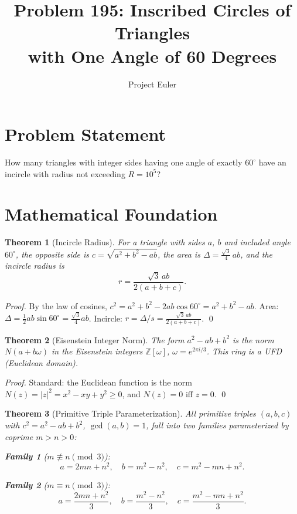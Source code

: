 \documentclass[12pt]{article}
\title{Problem 195: Inscribed Circles of Triangles\\with One Angle of 60 Degrees}
\author{Project Euler}
\date{}
\newtheorem{theorem}{Theorem}
\begin{document}
\maketitle

\section{Problem Statement}

How many triangles with integer sides having one angle of exactly $60^\circ$ have an incircle with radius not exceeding $R = 10^5$?

\section{Mathematical Foundation}

\begin{theorem}[Incircle Radius]
For a triangle with sides $a$, $b$ and included angle $60^\circ$, the opposite side is $c = \sqrt{a^2 + b^2 - ab}$, the area is $\Delta = \frac{\sqrt{3}}{4}\,ab$, and the incircle radius is
\[
r = \frac{\sqrt{3}\,ab}{2(a + b + c)}.
\]
\end{theorem}

\begin{proof}
By the law of cosines, $c^2 = a^2 + b^2 - 2ab\cos 60^\circ = a^2 + b^2 - ab$. Area: $\Delta = \frac{1}{2}ab\sin 60^\circ = \frac{\sqrt{3}}{4}ab$. Incircle: $r = \Delta/s = \frac{\sqrt{3}\,ab}{2(a+b+c)}$. \qed
\end{proof}

\begin{theorem}[Eisenstein Integer Norm]
The form $a^2 - ab + b^2$ is the norm $N(a + b\omega)$ in the Eisenstein integers $\mathbb{Z}[\omega]$, $\omega = e^{2\pi i/3}$. This ring is a UFD (Euclidean domain).
\end{theorem}

\begin{proof}
Standard: the Euclidean function is the norm $N(z) = |z|^2 = x^2 - xy + y^2 \geq 0$, and $N(z) = 0$ iff $z = 0$. \qed
\end{proof}

\begin{theorem}[Primitive Triple Parameterization]
All primitive triples $(a, b, c)$ with $c^2 = a^2 - ab + b^2$, $\gcd(a,b) = 1$, fall into two families parameterized by coprime $m > n > 0$:

\textbf{Family 1} ($m \not\equiv n \pmod{3}$):
\[
a = 2mn + n^2, \quad b = m^2 - n^2, \quad c = m^2 - mn + n^2.
\]

\textbf{Family 2} ($m \equiv n \pmod{3}$):
\[
a = \frac{2mn + n^2}{3}, \quad b = \frac{m^2 - n^2}{3}, \quad c = \frac{m^2 - mn + n^2}{3}.
\]
\end{theorem}
\end{document}
